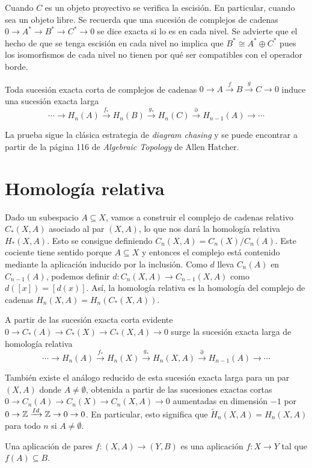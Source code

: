 \documentclass[TA.tex]{subfiles}
\begin{document}
Cuando $C$ es un objeto proyectivo se verifica la escisión. En particular, cuando sea un objeto libre. Se recuerda que una sucesión de complejos  de cadenas $0\to A^*\to B^*\to C^*\to 0$ se dice exacta si lo es en cada nivel. Se advierte que el hecho de que se tenga escisión en cada nivel no implica que $B^*\cong A^*\oplus C^*$ pues los isomorfismos de cada nivel no tienen por qué ser compatibles con el operador borde. 

\begin{teorema}
Toda sucesión exacta corta de complejos de cadenas $0\to A\xrightarrow{f} B\xrightarrow{g} C\to 0$ induce una sucesión exacta larga
\[
\cdots \to H_n(A)\xrightarrow{f_*}H_n(B)\xrightarrow{g_*}H_n(C)\xrightarrow{\partial}H_{n-1}(A)\to\cdots
\] 
\end{teorema}
La prueba sigue la clásica estrategia de \emph{diagram chasing} y se puede encontrar a partir de la página 116 de \emph{Algebraic Topology} de Allen Hatcher. 
\section{Homología relativa}

Dado un subespacio $A\subseteq X$, vamos a construir el complejo de cadenas relativo $C_*(X,A)$ asociado al par $(X,A)$, lo que nos dará la homología relativa $H_*(X,A)$. Esto se consigue definiendo $C_n(X,A)=C_n(X)/C_n(A)$. Este cociente tiene sentido porque $A\subseteq X$ y entonces el complejo está contenido mediante la aplicación inducido por la inclusión. Como $d$ lleva $C_n(A)$ en $C_{n-1}(A)$, podemos definir $d:C_n(X,A)\to C_{n-1}(X,A)$ como $d([x])=[d(x)]$. Así, la homología relativa es la homología del complejo de cadenas $H_n(X,A)=H_n(C_*(X,A))$. 

A partir de las sucesión exacta corta evidente $0\to C_*(A)\to C_*(X)\to C_*(X,A)\to 0$ surge la sucesión exacta larga de homología relativa
\[
\cdots \to H_n(A)\xrightarrow{f_*}H_n(X)\xrightarrow{g_*}H_n(X,A)\xrightarrow{\partial}H_{n-1}(A)\to\cdots
\]

También existe el análogo reducido de esta sucesión exacta larga para un par $(X,A)$ donde $A\neq\emptyset$, obtenida a partir de las sucesiones exactas cortas $0\to C_n(A)\to C_n(X)\to C_n(X,A)\to 0$ aumentadas en dimensión $-1$ por $0\to\mathbb{Z}\xrightarrow{Id}\mathbb{Z}\to 0\to 0$. En particular, esto significa que $\widetilde{H}_n(X,A)=H_n(X,A)$ para todo $n$ si $A\neq\emptyset$.

\begin{defi}
Una aplicación de pares $f:(X,A)\to (Y,B)$ es una aplicación $f:X\to Y$ tal que $f(A)\subseteq B$. 
\end{defi}
\end{document}
